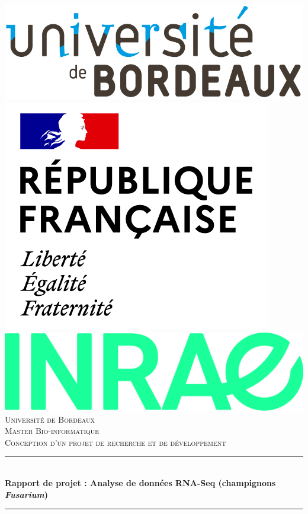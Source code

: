 \documentclass{report}
\begin{document}
\begin{titlepage}
\newcommand{\HRule}{\rule{\linewidth}{0.5mm}}
\newcommand{\reportyear}{Mai 2024}
\center

\includegraphics[scale=0.2]{img/logo_ub.png}
\hspace{3.61cm}
\includegraphics[scale=0.15]{img/logo_fr.png}
\includegraphics[scale=0.5]{img/logo_inrae.jpg}\\[1.5cm]


\textsc{\Large Université de Bordeaux}\\[0.2cm]
\textsc{\Large Master Bio-informatique}\\[0.2cm]
\textsc{\Large Conception d'un projet de recherche et de développement}\\[1cm]
\HRule \\[0.6cm]
{ \huge \bfseries Rapport de projet : Analyse de données RNA-Seq (champignons \textit{Fusarium})}\\[0.5cm]
\HRule \\[1cm]


\end{titlepage}
\end{document}
